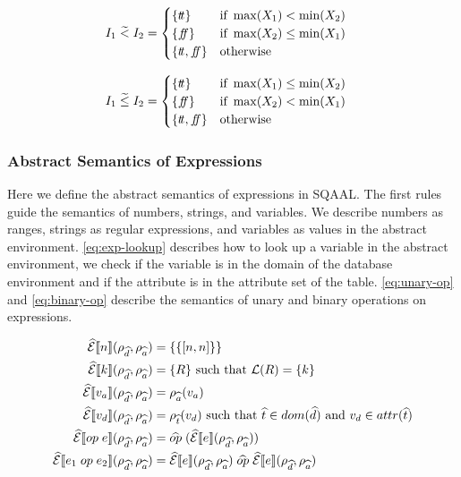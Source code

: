 \begin{align}
    I_1 \;\widetilde{<}\; I_2 &= \begin{cases}
        \{t\!t\} & \text{if } \max(X_1) < \min(X_2) \\
        \{f\!\!f\} & \text{if } \max(X_2) \leq \min (X_1) \\
        \{t\!t, f\!\!f\} & \text{otherwise}
    \end{cases}
\end{align}

\begin{align}
    I_1 \;\widetilde{\leq}\; I_2 &= \begin{cases}
        \{t\!t\} & \text{if } \max(X_1) \leq \min(X_2) \\
        \{f\!\!f\} & \text{if } \max(X_2) < \min (X_1) \\
        \{t\!t, f\!\!f\} & \text{otherwise}
    \end{cases}
\end{align}

\subsubsection{Abstract Semantics of Expressions}

Here we define the abstract semantics of expressions in SQAAL.
The first rules guide the semantics of numbers, strings, and variables.
We describe numbers as ranges, strings as regular expressions, and variables as values in the abstract environment.
\autoref{eq:exp-lookup} describes how to look up a variable in the abstract environment, we check if the variable is in the domain of the database environment and if the attribute is in the attribute set of the table.
\autoref{eq:unary-op} and \autoref{eq:binary-op} describe the semantics of unary and binary operations on expressions.

\begin{align}
    \absexpsem{n}(\rho_{\ab{d}}, \rho_{\ab{a}}) &= \{ \{ [n, n] \} \}\\
    \absexpsem{k}(\rho_{\ab{d}}, \rho_{\ab{a}}) &= \{ R \} \text{ such that }\mathcal{L}(R) = \{ k \} \\
    \absexpsem{v_a}(\rho_{\ab{d}}, \rho_{\ab{a}}) &=  \rho_{\ab{a}}(v_a) \\
    \absexpsem{v_d}(\rho_{\ab{d}}, \rho_{\ab{a}}) &=  \rho_{\ab{t}}(v_d) \text{ such that } \ab{t} \in dom(\ab{d}) \text{ and } v_d \in attr(\ab{t}) \\ \label{eq:exp-lookup}
    \absexpsem{op \; e}(\rho_{\ab{d}}, \rho_{\ab{a}}) &= \ab{op} \; (\absexpsem{e}(\rho_{\ab{d}}, \rho_{\ab{a}})) \\ \label{eq:unary-op}
    \absexpsem{e_1 \; op \; e_2}(\rho_{\ab{d}}, \rho_{\ab{a}}) &= \absexpsem{e}(\rho_{\ab{d}}, \rho_{\ab{a}}) \;\ab{op}\; \absexpsem{e}(\rho_{\ab{d}}, \rho_{\ab{a}})\\ \label{eq:binary-op}
\end{align}

